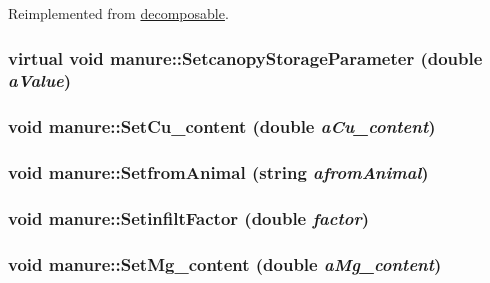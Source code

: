 Reimplemented from \hyperlink{classdecomposable_a79e5c1092b6c8f3e9f233a26ed308c63}{decomposable}.\hypertarget{classmanure_ae3f89476810dce15bb0e4d4a8d176bd5}{
\subsubsection[{SetcanopyStorageParameter}]{\setlength{\rightskip}{0pt plus 5cm}virtual void manure::SetcanopyStorageParameter (double {\em aValue})}}
\label{classmanure_ae3f89476810dce15bb0e4d4a8d176bd5}
\hypertarget{classmanure_aa979cd914677628162bbabecb00a292d}{
\subsubsection[{SetCu\_\-content}]{\setlength{\rightskip}{0pt plus 5cm}void manure::SetCu\_\-content (double {\em aCu\_\-content})}}
\label{classmanure_aa979cd914677628162bbabecb00a292d}
\hypertarget{classmanure_add39b3db240608cc79de01d322e01a7a}{
\subsubsection[{SetfromAnimal}]{\setlength{\rightskip}{0pt plus 5cm}void manure::SetfromAnimal (string {\em afromAnimal})}}
\label{classmanure_add39b3db240608cc79de01d322e01a7a}
\hypertarget{classmanure_a4b2a248f98de1f072d5b25d85e0a6641}{
\subsubsection[{SetinfiltFactor}]{\setlength{\rightskip}{0pt plus 5cm}void manure::SetinfiltFactor (double {\em factor})}}
\label{classmanure_a4b2a248f98de1f072d5b25d85e0a6641}
\hypertarget{classmanure_ab92a739f5a35221e48c8923af884e3a4}{
\subsubsection[{SetMg\_\-content}]{\setlength{\rightskip}{0pt plus 5cm}void manure::SetMg\_\-content (double {\em aMg\_\-content})}}
